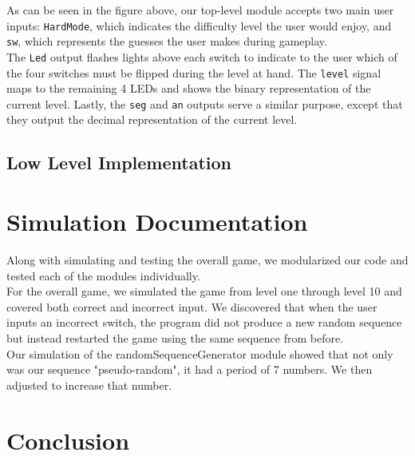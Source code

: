 \documentclass[]{article}
\begin{document}
As can be seen in the figure above, our top-level module accepts two main user inputs: \texttt{HardMode}, which indicates the difficulty level the user would enjoy, and \texttt{sw}, which represents the guesses the user makes during gameplay.\\

The \texttt{Led} output flashes lights above each switch to indicate to the user which of the four switches must be flipped during the level at hand. The \texttt{level} signal maps to the remaining 4 LEDs and shows the binary representation of the current level. Lastly, the \texttt{seg} and \texttt{an} outputs serve a similar purpose, except that they output the decimal representation of the current level.

\subsection{Low Level Implementation}


\section{Simulation Documentation}

Along with simulating and testing the overall game, we modularized our code and tested each of the modules individually. \\

For the overall game, we simulated the game from level one through level 10 and covered both correct and incorrect input. We discovered that when the user inputs an incorrect switch, the program did not produce a new random sequence but instead restarted the game using the same sequence from before. \\

Our simulation of the randomSequenceGenerator module showed that not only was our sequence "pseudo-random", it had a period of 7 numbers. We then adjusted to increase that number.

\section{Conclusion}
\end{document}
